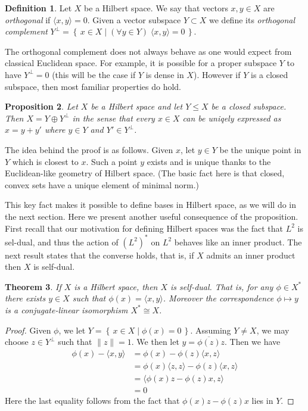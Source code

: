 \documentclass[11pt,oneside]{amsbook}
\newcommand{\set}[1]{\left\{\,#1\,\right\}}
\theoremstyle{definition}
\theoremstyle{plain}
\newtheorem{thm}{Theorem}[section]
\newtheorem{prop}[thm]{Proposition}
\theoremstyle{definition}
\newtheorem{defn}[thm]{Definition}
\theoremstyle{remark}
\numberwithin{equation}{section}
\numberwithin{figure}{section}
\begin{document}
\begin{defn}
  Let $X$ be a Hilbert space. We say that vectors $x,y\in X$ are \emph{orthogonal} if $\langle x,y\rangle=0$. Given a vector subspace $Y\subset X$ we define its \emph{orthogonal complement} $Y^\perp=\set{x\in X\mid(\forall y\in Y)\;\langle x,y\rangle=0}$.
\end{defn}

The orthogonal complement does not always behave as one would expect from classical Euclidean space. For example, it is possible for a proper subspace $Y$ to have $Y^\perp=0$ (this will be the case if $Y$ is dense in $X$). However if $Y$ is a closed subspace, then most familiar properties do hold.

\begin{prop}
  \label{prop:decomp}
  Let $X$ be a Hilbert space and let $Y\leq X$ be a closed subspace. Then $X=Y\oplus Y^\perp$ in the sense that every $x\in X$ can be uniqely expressed as $x=y+y'$ where $y\in Y$ and $Y'\in Y^\perp$.
\end{prop}

The idea behind the proof is as follows. Given $x$, let $y\in Y$ be the unique point in $Y$ which is closest to $x$. Such a point $y$ exists and is unique thanks to the Euclidean-like geometry of Hilbert space. (The basic fact here is that closed, convex sets have a unique element of minimal norm.)

This key fact makes it possible to define bases in Hilbert space, as we will do in the next section. Here we present another useful consequence of the proposition. First recall that our motivation for defining Hilbert spaces was the fact that $L^2$ is sel-dual, and thus the action of $(L^2)^*$ on $L^2$ behaves like an inner product. The next result states that the converse holds, that is, if $X$ admits an inner product then $X$ is self-dual.

\begin{thm}
  If $X$ is a Hilbert space, then $X$ is self-dual. That is, for any $\phi\in X^*$ there exists $y\in X$ such that $\phi(x)=\langle x,y\rangle$. Moreover the correspondence $\phi\mapsto y$ is a conjugate-linear isomorphism $X^*\cong X$.
\end{thm}

\begin{proof}
  Given $\phi$, we let $Y=\set{x\in X\mid\phi(x)=0}$. Assuming $Y\neq X$, we may choose $z\in Y^\perp$ such that $\|z\|=1$. We then let $y=\overline{\phi(z)}z$. Then we have
  \begin{align*}
    \phi(x)-\langle x,y\rangle&=\phi(x)-\phi(z)\langle x,z\rangle\\
                              &=\phi(x)\langle z,z\rangle-\phi(z)\langle x,z\rangle\\
                              &=\langle\phi(x)z-\phi(z)x,z\rangle\\
                              &=0
  \end{align*}
  Here the last equality follows from the fact that $\phi(x)z-\phi(z)x$ lies in $Y$.
\end{proof}
\end{document}
